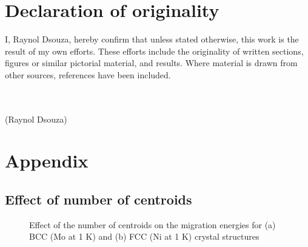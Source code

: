 \documentclass{article}
\begin{document}
\clearpage
\section{Declaration of originality}

I, Raynol Dsouza, hereby confirm that unless stated otherwise, this work is the result of my own efforts. These efforts include the originality of written sections, figures or similar pictorial material, and results. Where material is drawn from other sources, references have been included. \\
\\
\\
\begin{flushright}
(Raynol Dsouza)
\end{flushright}

\newpage
 


\newpage
\section{Appendix}

\subsection{Effect of number of centroids}

\begin{figure}[!htp]
\centering
{}
\hfill
\caption{Effect of the number of centroids on the migration energies for (a) BCC (Mo at 1 K) and (b) FCC (Ni at 1 K) crystal structures}
\label{fig:23}
\end{figure}
\end{document}
